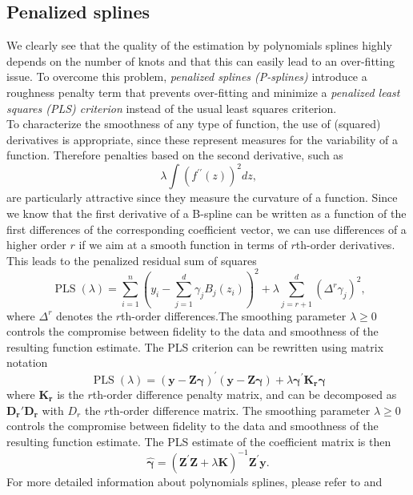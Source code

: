 \subsection{Penalized splines}
We clearly see that the quality of the estimation by polynomials splines highly depends on the number of knots and that this can easily lead to an over-fitting issue. To overcome this problem, \textit{penalized splines (P-splines)} introduce a roughness penalty term that prevents over-fitting and minimize a \textit{penalized least squares (PLS) criterion} instead of the usual least squares criterion.\\
To characterize the smoothness of any type of function, the
use of (squared) derivatives is appropriate, since these represent measures for the variability of a function. Therefore penalties based on the second derivative, such as
\[ \lambda \int \left( f ^ { \prime \prime } ( z ) \right) ^ { 2 } d z\text{,} \]
are particularly attractive since they measure the curvature of a function. Since we know that the first derivative of a B-spline can be written as a function of the first differences of the corresponding coefficient vector, we can use differences of a higher order $r$ if we aim at a smooth function in terms of $r$th-order derivatives. This leads to the penalized residual sum of squares
\[\operatorname { PLS } ( \lambda ) = \sum _ { i = 1 } ^ { n } \left( y _ { i } - \sum _ { j = 1 } ^ { d } \gamma _ { j } B _ { j } \left( z _ { i } \right) \right) ^ { 2 } + \lambda \sum _ { j = r + 1 } ^ { d } \left( \Delta ^ { r } \gamma _ { j } \right) ^ { 2 }\text{,}\]
where $\Delta^r$ denotes the $r$th-order differences.The smoothing parameter $\lambda \geq 0$ controls the compromise between fidelity to the data and smoothness of the resulting function estimate. The PLS criterion can be rewritten using matrix notation
\[ \operatorname { PLS } ( \lambda ) = ( \mathbf{y} - \mathbf{Z} \boldsymbol{\gamma} ) ^ { \prime } (  \mathbf{y} - \mathbf{Z} \boldsymbol{\gamma}) + \lambda \boldsymbol{\gamma} ^ { \prime }\mathbf{K_r} \boldsymbol{\gamma} \]
where $\mathbf{K_r}$ is the $r$th-order difference penalty matrix, and can be decomposed as $\mathbf{D_r}\prime \mathbf{D_r}$ with $D_r$ the $r$th-order difference matrix.
The smoothing parameter $\lambda \geq 0$ controls the compromise between fidelity to the data and smoothness of the resulting function estimate. The PLS estimate of the coefficient matrix is then 
\[ \hat { \boldsymbol{\gamma} } = \left(\mathbf{ Z} ^ { \prime } \mathbf {Z} + \lambda \mathbf{K} \right) ^ { - 1 }\mathbf{ Z} ^ { \prime }\mathbf{ y} \text{.}\]
For more detailed information about polynomials splines, please refer to \textcite{fahrmeir_regression:_2013} and \textcite{eilers_flexible_1996}

